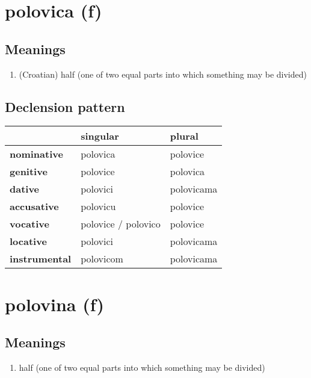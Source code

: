 \filbreak
\section{polovica (f)}
\subsection*{Meanings}
\begin{enumerate}
\item (Croatian) half (one of two equal parts into which something may be divided)
\end{enumerate}
\subsection*{Declension pattern}
\begin{tabularx}{\linewidth}{Xll}
\toprule
{} &             singular &      plural \\
\midrule
\textbf{nominative  } &             polovica &    polovice \\
\textbf{genitive    } &             polovice &    polovica \\
\textbf{dative      } &             polovici &  polovicama \\
\textbf{accusative  } &             polovicu &    polovice \\
\textbf{vocative    } &  polovice / polovico &    polovice \\
\textbf{locative    } &             polovici &  polovicama \\
\textbf{instrumental} &            polovicom &  polovicama \\
\bottomrule
\end{tabularx}

\filbreak
\section{polovina (f)}
\subsection*{Meanings}
\begin{enumerate}
\item half (one of two equal parts into which something may be divided)
\end{enumerate}
